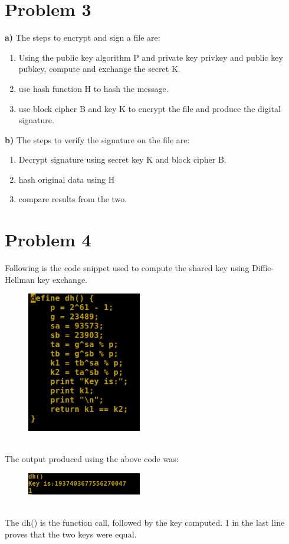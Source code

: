 \documentclass[10pt]{article}
\begin{document}
\section{Problem 3}
\textbf{a)} The steps to encrypt and sign a file are:
\begin{enumerate}
\item Using the public key algorithm P and private key privkey and public key pubkey, compute and exchange the secret K.
\item use hash function H to hash the message.
\item use block cipher B and key K to encrypt the file and produce the digital signature.\\
\end{enumerate}
\textbf{b)} The steps to verify the signature on the file are:
\begin{enumerate}
\item Decrypt signature using secret key K and block cipher B.
\item hash original data using H
\item compare results from the two.
\end{enumerate}
\section{Problem 4}
Following is the code snippet used to compute the shared key using Diffie-Hellman key exchange.
\begin{figure}[ht!]
\centering
\includegraphics[width=50mm]{code.jpg}
\end{figure}\\
The output produced using the above code was:
\begin{figure}[ht!]
\centering
\includegraphics[width=50mm]{output.png}
\end{figure}\\
The dh() is the function call, followed by the key computed. 1 in the last line proves that the two keys were equal.
\end{document}
